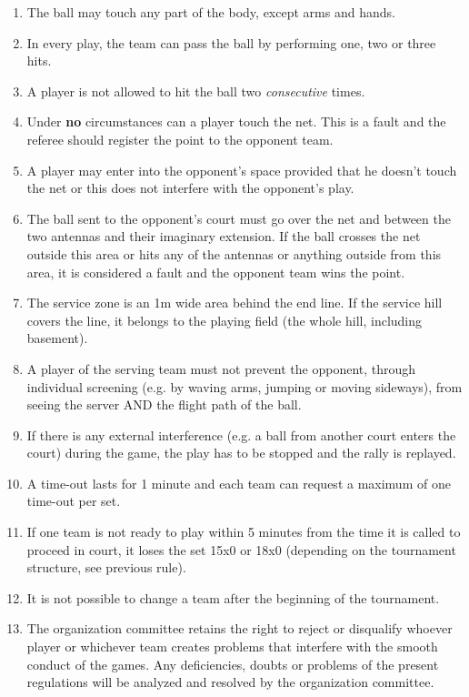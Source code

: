 \documentclass[a4paper,11pt]{article}
\begin{document}
\begin{enumerate}
\item The ball may touch any part of the body, except arms and hands.

\item In every play, the team can pass the ball by performing one, two or three
  hits.

\item A player is not allowed to hit the ball two \textit{consecutive} times.

\item Under \textbf{no} circumstances can a player touch the net. This is a
  fault and the referee should register the point to the opponent team.

\item A player may enter into the opponent’s space provided that he doesn't
  touch the net or this does not interfere with the opponent’s play.

\item The ball sent to the opponent’s court must go over the net and between the
  two antennas and their imaginary extension. If the ball crosses the net
  outside this area or hits any of the antennas or anything outside from this
  area, it is considered a fault and the opponent team wins the point.

\item The service zone is an 1m wide area behind the end line. If the service
  hill covers the line, it belongs to the playing field (the whole hill,
  including basement).

\item A player of the serving team must not prevent the opponent, through
  individual screening (e.g. by waving arms, jumping or moving sideways), from
  seeing the server AND the flight path of the ball.

\item If there is any external interference (e.g. a ball from another court
  enters the court) during the game, the play has to be stopped and the rally is
  replayed.

\item A time-out lasts for 1 minute and each team can request a maximum of one
  time-out per set.

\item If one team is not ready to play within 5 minutes from the time it is
  called to proceed in court, it loses the set 15x0 or 18x0 (depending on the
  tournament structure, see previous rule).

\item It is not possible to change a team after the beginning of the tournament.

\item The organization committee retains the right to reject or disqualify
  whoever player or whichever team creates problems that interfere with the
  smooth conduct of the games. Any deficiencies, doubts or problems of the
  present regulations will be analyzed and resolved by the organization
  committee.

\end{enumerate}
\end{document}
